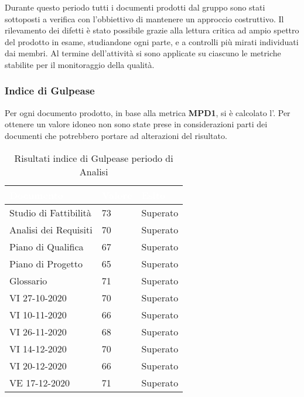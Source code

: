 Durante questo periodo tutti i documenti prodotti dal gruppo \Gruppo{} sono stati sottoposti a verifica con l'obbiettivo di mantenere un approccio costruttivo. Il rilevamento dei difetti è stato possibile grazie alla lettura critica ad ampio spettro del prodotto in esame, studiandone ogni parte, e a controlli più mirati individuati dai membri. Al termine dell'attività si sono applicate su ciascuno le metriche stabilite per il monitoraggio della qualità.

\subsubsection{Indice di Gulpease}
Per ogni documento prodotto, in base alla metrica \textbf{MPD1}, si è calcolato l'. Per ottenere un valore idoneo non sono state prese in considerazioni parti dei documenti che potrebbero portare ad alterazioni del risultato.

\renewcommand{\arraystretch}{1.5}
\begin{longtable}{C{4cm} C{2cm} C{3cm}}
\textcolor{white}{\textbf{Documento}}&
\textcolor{white}{\textbf{Valore}}&
\textcolor{white}{\textbf{Esito}}\\	
\endhead
\endfoot
{}
\caption{Risultati indice di Gulpease periodo di Analisi}
\endlastfoot

Studio di Fattibilità & 73 & Superato \\

Analisi dei Requisiti & 70 & Superato \\

Piano di Qualifica & 67 & Superato \\

Piano di Progetto & 65 & Superato \\

Glossario & 71 & Superato \\

VI 27-10-2020 & 70 & Superato \\

VI 10-11-2020 & 66 & Superato \\

VI 26-11-2020 & 68 & Superato \\

VI 14-12-2020 & 70 & Superato \\

VI 20-12-2020 & 66 & Superato \\

VE 17-12-2020 & 71 & Superato \\
 
\end{longtable}